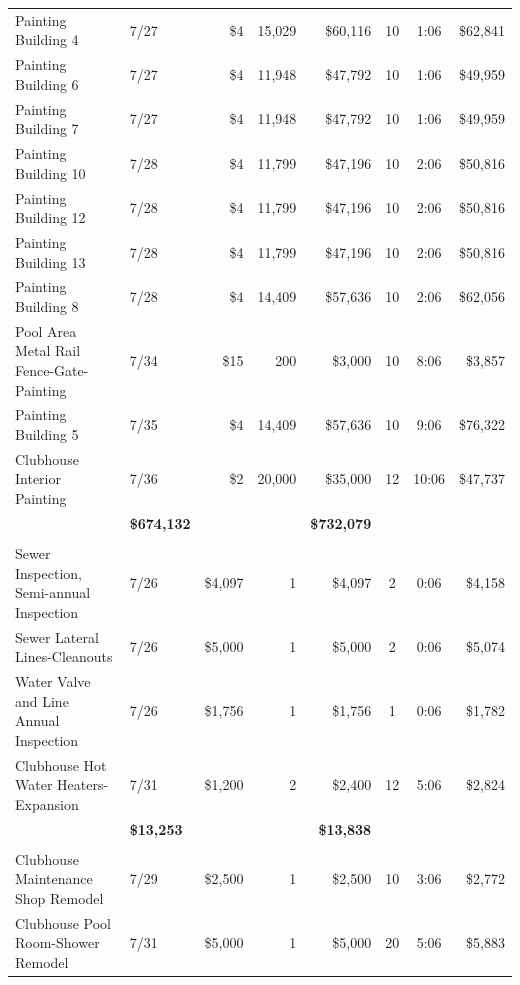 \documentclass[11pt,letterpaper]{article}
\begin{document}
\begin{longtable}{p{4.2cm} p{1.6cm} r r r c c r}
\rowcolor{blue!12} Painting Building 4 & 7/27 & \$4 & 15,029 & \$60,116 & 10 & 1:06 & \$62,841 \\
Painting Building 6 & 7/27 & \$4 & 11,948 & \$47,792 & 10 & 1:06 & \$49,959 \\
\rowcolor{blue!12} Painting Building 7 & 7/27 & \$4 & 11,948 & \$47,792 & 10 & 1:06 & \$49,959 \\
Painting Building 10 & 7/28 & \$4 & 11,799 & \$47,196 & 10 & 2:06 & \$50,816 \\
\rowcolor{blue!12} Painting Building 12 & 7/28 & \$4 & 11,799 & \$47,196 & 10 & 2:06 & \$50,816 \\
Painting Building 13 & 7/28 & \$4 & 11,799 & \$47,196 & 10 & 2:06 & \$50,816 \\
\rowcolor{blue!12} Painting Building 8 & 7/28 & \$4 & 14,409 & \$57,636 & 10 & 2:06 & \$62,056 \\
Pool Area Metal Rail Fence-Gate-Painting & 7/34 & \$15 & 200 & \$3,000 & 10 & 8:06 & \$3,857 \\
\rowcolor{blue!12} Painting Building 5 & 7/35 & \$4 & 14,409 & \$57,636 & 10 & 9:06 & \$76,322 \\
Clubhouse Interior Painting & 7/36 & \$2 & 20,000 & \$35,000 & 12 & 10:06 & \$47,737 \\
\addlinespace[1pt] \multicolumn{4}{r}{} & \textbf{\$674,132} & & & \textbf{\$732,079} \\
\addlinespace[6pt]
\multicolumn{8}{l}{\textbf{Plumbing}} \\
\rowcolor{blue!12} Sewer Inspection, Semi-annual Inspection & 7/26 & \$4,097 & 1 & \$4,097 & 2 & 0:06 & \$4,158 \\
Sewer Lateral Lines-Cleanouts & 7/26 & \$5,000 & 1 & \$5,000 & 2 & 0:06 & \$5,074 \\
\rowcolor{blue!12} Water Valve and Line Annual Inspection & 7/26 & \$1,756 & 1 & \$1,756 & 1 & 0:06 & \$1,782 \\
Clubhouse Hot Water Heaters-Expansion & 7/31 & \$1,200 & 2 & \$2,400 & 12 & 5:06 & \$2,824 \\
\addlinespace[1pt] \multicolumn{4}{r}{} & \textbf{\$13,253} & & & \textbf{\$13,838} \\
\addlinespace[6pt]
\multicolumn{8}{l}{\textbf{Renovation}} \\
\rowcolor{blue!12} Clubhouse Maintenance Shop Remodel & 7/29 & \$2,500 & 1 & \$2,500 & 10 & 3:06 & \$2,772 \\
Clubhouse Pool Room-Shower Remodel & 7/31 & \$5,000 & 1 & \$5,000 & 20 & 5:06 & \$5,883 \\

\end{longtable}
\end{document}
